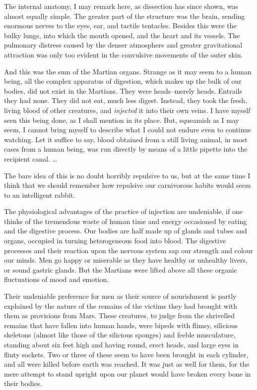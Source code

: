 The internal anatomy, I may remark here, as dissection has since
shown, was almost equally simple. The greater part of the structure
was the brain, sending enormous nerves to the eyes, ear, and
tactile tentacles. Besides this were the bulky lungs, into which
the mouth opened, and the heart and its vessels. The pulmonary
distress caused by the denser atmosphere and greater gravitational
attraction was only too evident in the convulsive movements of the
outer skin.

And this was the sum of the Martian organs. Strange as it may seem
to a human being, all the complex apparatus of digestion, which
makes up the bulk of our bodies, did not exist in the Martians.
They were heads--merely heads. Entrails they had none. They did not
eat, much less digest. Instead, they took the fresh, living blood
of other creatures, and \emph{injected} it into their own veins. I
have myself seen this being done, as I shall mention in its place.
But, squeamish as I may seem, I cannot bring myself to describe
what I could not endure even to continue watching. Let it suffice
to say, blood obtained from a still living animal, in most cases
from a human being, was run directly by means of a little pipette
into the recipient canal. \ldots{}

The bare idea of this is no doubt horribly repulsive to us, but at
the same time I think that we should remember how repulsive our
carnivorous habits would seem to an intelligent rabbit.

The physiological advantages of the practice of injection are
undeniable, if one thinks of the tremendous waste of human time and
energy occasioned by eating and the digestive process. Our bodies
are half made up of glands and tubes and organs, occupied in
turning heterogeneous food into blood. The digestive processes and
their reaction upon the nervous system sap our strength and colour
our minds. Men go happy or miserable as they have healthy or
unhealthy livers, or sound gastric glands. But the Martians were
lifted above all these organic fluctuations of mood and emotion.

Their undeniable preference for men as their source of nourishment
is partly explained by the nature of the remains of the victims
they had brought with them as provisions from Mars. These
creatures, to judge from the shrivelled remains that have fallen
into human hands, were bipeds with flimsy, silicious skeletons
(almost like those of the silicious sponges) and feeble
musculature, standing about six feet high and having round, erect
heads, and large eyes in flinty sockets. Two or three of these seem
to have been brought in each cylinder, and all were killed before
earth was reached. It was just as well for them, for the mere
attempt to stand upright upon our planet would have broken every
bone in their bodies.

